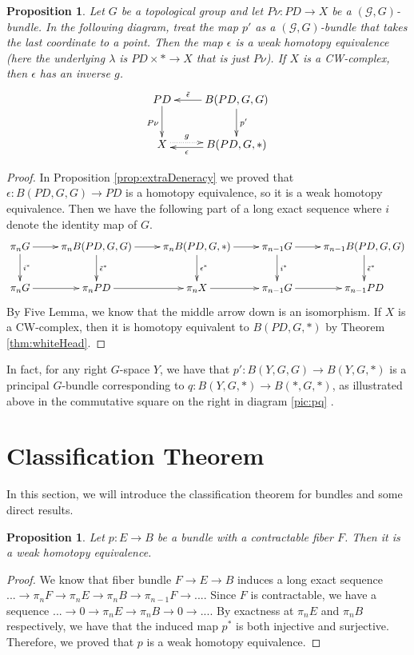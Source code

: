 \documentclass[psamsfonts]{amsart}
\newcommand{\hana}[1]{{\color{violet}{#1}}}
\newtheorem{prop}[thm]{Proposition}
\theoremstyle{definition}
\theoremstyle{remark}
\numberwithin{equation}{section}
\begin{document}
\begin{prop}
\label{prop:pq}
Let $G$ be a topological group and let $P\nu: PD \rightarrow X$ be a $(\mathcal{G}, G)$-bundle. In the following diagram, treat the map $p'$ as a $(\mathcal{G}, G)$-bundle that takes the last coordinate to a point. Then the map $\epsilon$ is a weak homotopy equivalence (here the underlying $\lambda$ is $PD \times * \to X$ that is just $P\nu$). If $X$ is a CW-complex, then $\epsilon$ has an inverse $g$. 
\[\xymatrix{
PD \ar[d]_{P\nu} & B(PD, G, G) \ar[l]_-{\tilde{\epsilon}} \ar[d]^{p'}\\
X \ar@{.>}[r]<.5ex>^-{g} & B(PD, G, *) \ar[l]<.5ex>^-{\epsilon} \\} \]
\end{prop}

\begin{proof}
In Proposition \ref{prop:extraDeneracy} we proved that $\epsilon: B(PD, G, G) \to PD$ is a homotopy equivalence, so it is a weak homotopy equivalence. Then we have the following part of a long exact sequence where $i$ denote the identity map of $G$. 
\[\xymatrix{
\pi_{n}G \ar[d]^-{i^{*}} \ar[r] & \pi_{n}B(PD, G, G) \ar[d]^-{\tilde{\epsilon}^{*}} \ar[r]& \pi_{n}B(PD, G, *) \ar[d]^{\epsilon^{*}} \ar[r] & \pi_{n - 1}G \ar[r] \ar[d]^-{i^{*}} & \pi_{n - 1}B(PD, G, G) \ar[d]^-{\tilde{\epsilon}^{*}}\\
\pi_{n}G \ar[r] & \pi_{n}PD \ar[r] & \pi_{n}X \ar[r] & \pi_{n - 1}G \ar[r] & \pi_{n - 1}PD\\} \]
By Five Lemma, we know that the middle arrow down is an isomorphism. If $X$ is a CW-complex, then it is homotopy equivalent to $B(PD, G, *)$ by Theorem \ref{thm:whiteHead}.
\end{proof}

In fact, for any right $G$-space $Y$, we have that $p': B(Y, G, G) \rightarrow B(Y, G, *)$ is a principal $G$-bundle corresponding to $q: B(Y, G, *) \rightarrow B(*, G, *)$, as illustrated above in the commutative square on the right in diagram \ref{pic:pq} \hana{use equation environment for the diagram and you will have a label attached to it}.


\section{Classification Theorem}
\label{sec:class}
In this section, we will introduce the classification theorem for bundles and some direct results.

\begin{prop}
\label{prop: contractable}
Let $p: E \to B$ be a bundle with a contractable fiber $F$. Then it is a weak homotopy equivalence. 
\end{prop}
\begin{proof}
We know that fiber bundle $F \to E \to B$ induces a long exact sequence $... \to \pi_{n}F \to \pi_{n}E \to \pi_{n}B \to \pi_{n - 1}F \to...$. Since $F$ is contractable, we have a sequence $... \to 0 \to \pi_{n}E \to \pi_{n}B \to 0 \to...$. By exactness at $\pi_{n}E$ and $\pi_{n}B$ respectively, we have that the induced map $p^{*}$ is both injective and surjective. Therefore, we proved that $p$ is a weak homotopy equivalence.
\end{proof}
\end{document}
